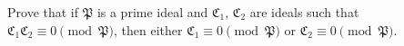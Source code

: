 Prove that if $\mathfrak{P}$ is a prime ideal and $\mathfrak{C}_1$, $\mathfrak{C}_2$ are ideals such that $\mathfrak{C}_1 \mathfrak{C}_2 \equiv 0 \pmod{\mathfrak{P}}$, then either $\mathfrak{C}_1 \equiv 0 \pmod{\mathfrak{P}}$ or $\mathfrak{C}_2 \equiv 0 \pmod{\mathfrak{P}}$.
